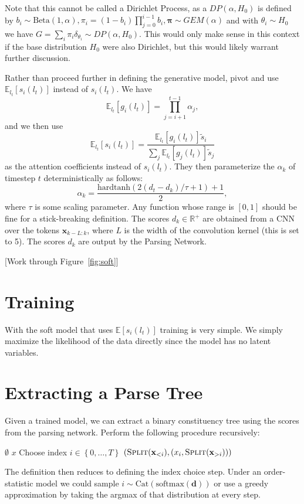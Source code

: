 \documentclass{article}
\newcommand\set[1]{\left\{#1\right\}}
\newcommand{\Cat}{\mathrm{Cat}}
\newcommand\Betad{\mathrm{Beta}}
\newcommand\E[1]{\mathbb{E}\left[#1\right]}
\newcommand\Es[2]{\mathbb{E}_{#1}\left[#2\right]}
\newcommand{\bd}{\mathbf{d}}
\newcommand{\bx}{\mathbf{x}}
\begin{document}
Note that this cannot be called a Dirichlet Process, as a $DP(\alpha, H_0)$ is defined by
$b_i\sim\Betad(1,\alpha),\pi_i=(1-b_i)\prod_{j=0}^{i-1}b_i,\bm{\pi}\sim GEM(\alpha)$
and with $\theta_i\sim H_0$ we have $G = \sum_i\pi_i\delta_{\theta_i}\sim DP(\alpha, H_0)$.
This would only make sense in this context if the base distribution $H_0$ were also Dirichlet,
but this would likely warrant further discussion.

Rather than proceed further in defining the generative model,
\citet{shen2018prpn} pivot and use $\Es{l_t}{s_i(l_t)}$ instead of $s_i(l_t)$.
We have
\begin{equation}
\Es{l_t}{g_i(l_t)} = \prod_{j=i+1}^{t-1}\alpha_j,
\end{equation}
and we then use
\begin{equation}
\Es{l_t}{s_i(l_t)} = \frac{\Es{l_t}{g_i(l_t)}\tilde{s}_i}{\sum_j\Es{l_t}{g_j(l_t)}\tilde{s}_j}
\end{equation}
as the attention coefficients instead of $s_i(l_t)$.
They then parameterize the $\alpha_k$ of timestep $t$ deterministically as follows:
\begin{equation}
\alpha_k = \frac{\textrm{hardtanh}(2(d_t-d_k)/\tau+1)+1}{2},
\end{equation}
where $\tau$ is some scaling parameter.
Any function whose range is $[0,1]$ should be fine for a stick-breaking definition.
The scores $d_k\in\mathbb{R}^+$ are obtained from a CNN over the tokens $\bx_{k-L:k}$,
where $L$ is the width of the convolution kernel (this is set to 5).
The scores $d_k$ are output by the Parsing Network.

[Work through Figure~\ref{fig:soft}]

\section{Training}
With the soft model that uses $\E{s_i(l_t)}$ training is very simple.
We simply maximize the likelihood of the data directly since the model has no latent variables.

\section{Extracting a Parse Tree}
Given a trained model, we can extract a binary constituency tree using the scores from the parsing network.
Perform the following procedure recursively:
\begin{algorithmic}
\Function{Split}{$x = \set{x_0,\ldots,x_T}$}
\State \Return $\emptyset$
\State \Return $x$
\Else
\State Choose index $i\in\set{0,\ldots,T}$ 
\State \Return $(\Call{Split}{\bx_{<i}}, (x_i, \Call{Split}{\bx_{>i}}))$
\EndIf
\EndFunction
\end{algorithmic}
The definition then reduces to defining the index choice step.
Under an order-statistic model we could sample $i\sim\Cat(\textrm{softmax}(\bd))$
or use a greedy approximation by taking the argmax of that distribution at every step.
\end{document}
